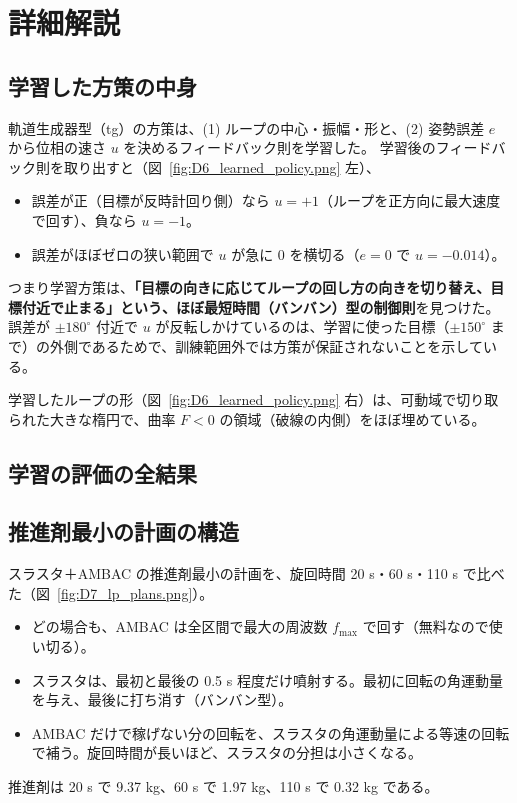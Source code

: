 \section{詳細解説}

\subsection{学習した方策の中身}

軌道生成器型（tg）の方策は、(1) ループの中心・振幅・形と、(2) 姿勢誤差 $e$ から位相の速さ $u$ を決めるフィードバック則を学習した。
学習後のフィードバック則を取り出すと（図~\ref{fig:D6_learned_policy.png} 左）、
\begin{itemize}
\item 誤差が正（目標が反時計回り側）なら $u=+1$（ループを正方向に最大速度で回す）、負なら $u=-1$。
\item 誤差がほぼゼロの狭い範囲で $u$ が急に 0 を横切る（$e=0$ で $u=-0.014$）。
\end{itemize}
つまり学習方策は、\textbf{「目標の向きに応じてループの回し方の向きを切り替え、目標付近で止まる」という、ほぼ最短時間（バンバン）型の制御則}を見つけた。
誤差が $\pm180^\circ$ 付近で $u$ が反転しかけているのは、学習に使った目標（$\pm150^\circ$ まで）の外側であるためで、訓練範囲外では方策が保証されないことを示している。

学習したループの形（図~\ref{fig:D6_learned_policy.png} 右）は、可動域で切り取られた大きな楕円で、曲率 $F<0$ の領域（破線の内側）をほぼ埋めている。


\subsection{学習の評価の全結果}


\subsection{推進剤最小の計画の構造}

スラスタ＋AMBAC の推進剤最小の計画を、旋回時間 20 s・60 s・110 s で比べた（図~\ref{fig:D7_lp_plans.png}）。
\begin{itemize}
\item どの場合も、AMBAC は全区間で最大の周波数 $f_{\max}$ で回す（無料なので使い切る）。
\item スラスタは、最初と最後の 0.5 s 程度だけ噴射する。最初に回転の角運動量を与え、最後に打ち消す（バンバン型）。
\item AMBAC だけで稼げない分の回転を、スラスタの角運動量による等速の回転で補う。旋回時間が長いほど、スラスタの分担は小さくなる。
\end{itemize}
推進剤は 20 s で 9.37 kg、60 s で 1.97 kg、110 s で 0.32 kg である。

